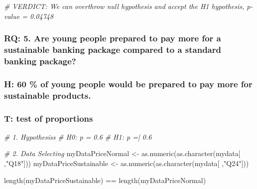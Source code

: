 \documentclass[
]{article}
\newenvironment{Shaded}{\begin{snugshade}}{\end{snugshade}}
\newcommand{\CommentTok}[1]{\textcolor[rgb]{0.56,0.35,0.01}{\textit{#1}}}
\newcommand{\FunctionTok}[1]{\textcolor[rgb]{0.00,0.00,0.00}{#1}}
\newcommand{\NormalTok}[1]{#1}
\newcommand{\OtherTok}[1]{\textcolor[rgb]{0.56,0.35,0.01}{#1}}
\newcommand{\SpecialCharTok}[1]{\textcolor[rgb]{0.00,0.00,0.00}{#1}}
\newcommand{\StringTok}[1]{\textcolor[rgb]{0.31,0.60,0.02}{#1}}
\begin{document}
\begin{Shaded}
\begin{Highlighting}[]
\CommentTok{\# VERDICT: We can overthrow null hypothesis and accept the H1 hypothesis, p{-}value = 0.04748}
\end{Highlighting}
\end{Shaded}

\hypertarget{rq-5.-are-young-people-prepared-to-pay-more-for-a-sustainable-banking-package-compared-to-a-standard-banking-package}{%
\subsubsection{RQ: 5. Are young people prepared to pay more for a
sustainable banking package compared to a standard banking
package?}\label{rq-5.-are-young-people-prepared-to-pay-more-for-a-sustainable-banking-package-compared-to-a-standard-banking-package}}

\hypertarget{h-60-of-young-people-would-be-prepared-to-pay-more-for-sustainable-products.}{%
\subsubsection{H: 60 \% of young people would be prepared to pay more
for sustainable
products.}\label{h-60-of-young-people-would-be-prepared-to-pay-more-for-sustainable-products.}}

\hypertarget{t-test-of-proportions-1}{%
\subsubsection{T: test of proportions}\label{t-test-of-proportions-1}}

\begin{Shaded}
\begin{Highlighting}[]
\CommentTok{\# 1. Hypothesis\textquotesingle{}s}
\CommentTok{\# H0: p = 0.6}
\CommentTok{\# H1: p =| 0.6}

\CommentTok{\# 2. Data Selecting}
\NormalTok{myDataPriceNormal }\OtherTok{\textless{}{-}} \FunctionTok{as.numeric}\NormalTok{(}\FunctionTok{as.character}\NormalTok{(mydata[ ,}\StringTok{"Q18"}\NormalTok{]))}
\NormalTok{myDataPriceSustainable }\OtherTok{\textless{}{-}} \FunctionTok{as.numeric}\NormalTok{(}\FunctionTok{as.character}\NormalTok{(mydata[ ,}\StringTok{"Q24"}\NormalTok{]))}

\FunctionTok{length}\NormalTok{(myDataPriceSustainable) }\SpecialCharTok{==} \FunctionTok{length}\NormalTok{(myDataPriceNormal)}
\end{Highlighting}
\end{Shaded}
\end{document}
